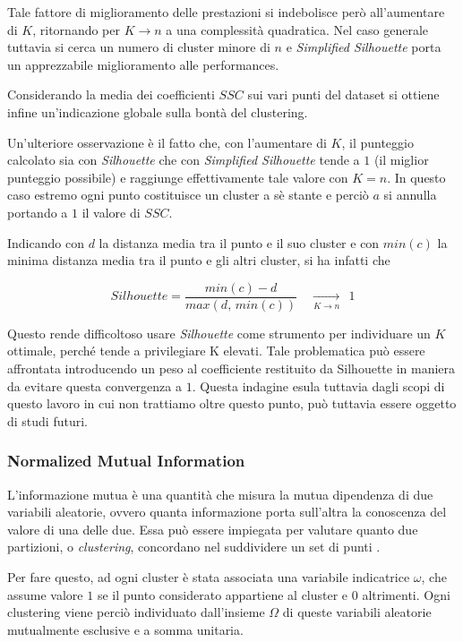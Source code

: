 \documentclass[
	11pt, %
	a4paper, %
	oneside, %
	headinclude,footinclude, %
	BCOR5mm, %
]{scrartcl}
\begin{document}
			Tale fattore di miglioramento delle prestazioni si indebolisce però all'aumentare di $K$, ritornando per $K \to n$ a una complessità quadratica.
			Nel caso generale tuttavia si cerca un numero di cluster minore di $n$ e \emph{Simplified Silhouette} porta un apprezzabile miglioramento alle performances.

			Considerando la media dei coefficienti $SSC$ sui vari punti del dataset si ottiene infine un'indicazione globale sulla bontà del clustering.

			\smallbreak
			Un'ulteriore osservazione è il fatto che, con l'aumentare di $K$, il punteggio calcolato sia con \emph{Silhouette} che con \emph{Simplified Silhouette} tende a $1$ (il miglior punteggio possibile) e raggiunge effettivamente tale valore con $K = n$.
			In questo caso estremo ogni punto costituisce un cluster a sè stante e perciò $a$ si annulla portando a $1$ il valore di $SSC$.

			Indicando con $d$ la distanza media tra il punto e il suo cluster e con $min(c)$ la minima distanza media tra il punto e gli altri cluster, si ha infatti che

			\begin{equation} \label{eq:silhouetteToOne}
				Silhouette = \frac{min(c) - d}{ max(d, \,min(c)) } \quad \xrightarrow [K \to n] \quad ~~ 1 \end{equation}

			Questo rende difficoltoso usare \emph{Silhouette} come strumento per individuare un $K$ ottimale, perché tende a privilegiare K elevati.
			Tale problematica può essere affrontata introducendo un peso al coefficiente restituito da Silhouette in maniera da evitare questa convergenza a $1$.
			Questa indagine esula tuttavia dagli scopi di questo lavoro in cui non trattiamo oltre questo punto, pu\`{o} tuttavia essere oggetto di studi futuri.

		\subsubsection{Normalized Mutual Information} \label{sec:NMI}
			L'informazione mutua è una quantità che misura la mutua dipendenza di due variabili aleatorie, ovvero quanta informazione porta sull'altra la conoscenza del valore di una delle due.
			Essa può essere impiegata per valutare quanto due partizioni, o \emph{clustering}, concordano nel suddividere un set di punti \cite{Manning}.

			Per fare questo, ad ogni cluster è stata associata una variabile indicatrice $\omega$, che assume valore $1$ se il punto considerato appartiene al cluster e $0$ altrimenti.
			Ogni clustering viene perciò individuato dall'insieme $\Omega$ di queste variabili aleatorie mutualmente esclusive e a somma unitaria.
\end{document}

